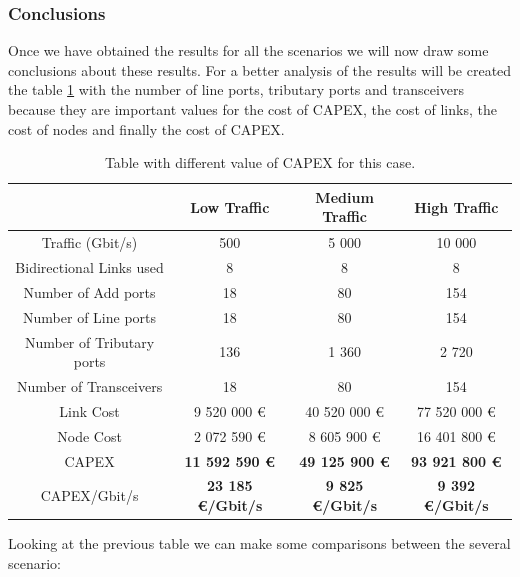 \vspace{13pt}
\subsubsection{Conclusions}

Once we have obtained the results for all the scenarios we will now draw some conclusions about these results. For a better analysis of the results will be created the table \ref{table_comparative_transl_surv_heuristic} with the number of line ports, tributary ports and transceivers because they are important values for the cost of CAPEX, the cost of links, the cost of nodes and finally the cost of CAPEX.\\

\begin{table}[H]
\centering
\begin{tabular}{| c | c | c | c |}
 \hline
   & Low Traffic & Medium Traffic  & High Traffic \\
 \hline\hline
 Traffic (Gbit/s) & 500 & 5 000 & 10 000 \\ \hline
 Bidirectional Links used & 8 & 8 & 8 \\ \hline
 Number of Add ports & 18 & 80 & 154 \\ \hline
 Number of Line ports & 18 & 80 & 154 \\ \hline
 Number of Tributary ports & 136 & 1 360 & 2 720 \\ \hline
 Number of Transceivers & 18 & 80 & 154 \\ \hline
 Link Cost & 9 520 000 \euro & 40 520 000 \euro & 77 520 000 \euro \\ \hline
 Node Cost & 2 072 590 \euro & 8 605 900 \euro & 16 401 800 \euro \\ \hline
 CAPEX & \textbf{11 592 590 \euro} & \textbf{49 125 900 \euro} & \textbf{93 921 800 \euro} \\ \hline
 CAPEX/Gbit/s & \textbf{23 185 \euro/Gbit/s} & \textbf{9 825 \euro/Gbit/s} & \textbf{9 392 \euro/Gbit/s} \\ \hline
\end{tabular}
\caption{Table with different value of CAPEX for this case.}
\label{table_comparative_transl_surv_heuristic}
\end{table}

\noindent
Looking at the previous table we can make some comparisons between the several scenario:

